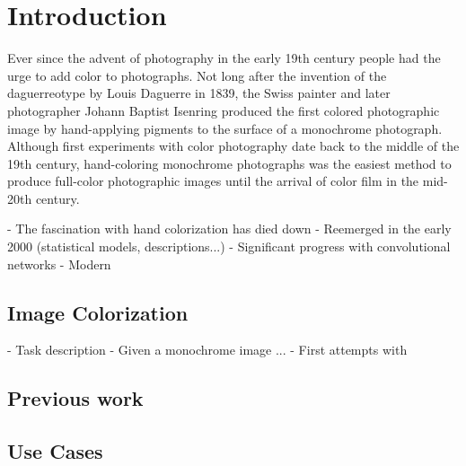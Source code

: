 \chapter{Introduction}

\begin{comment}
    The introduction to the thesis

    Colorization definition

    Topics to cover:
        What is image colorization
        Why is it useful
        What can it be used for
        Description of the task

        Not sure about previous work, if there is enough text, it might be its own chapter

\end{comment}

Ever since the advent of photography in the early 19th century people had
the urge to add color to photographs. Not long after the invention of the 
daguerreotype by Louis Daguerre in 1839, the Swiss painter and later photographer 
Johann Baptist Isenring produced the first colored photographic image by 
hand-applying pigments to the surface of a monochrome photograph. Although 
first experiments with color photography date back to the middle of the 19th 
century, hand-coloring monochrome photographs was the easiest method to 
produce full-color photographic images until the arrival of color film in the mid-20th century.

- The fascination with hand colorization has died down
- Reemerged in the early 2000 (statistical models, descriptions...)
- Significant progress with convolutional networks
- Modern

\section{Image Colorization}

- Task description
- Given a monochrome image ...
- First attempts with 

\section{Previous work}



\section{Use Cases}

